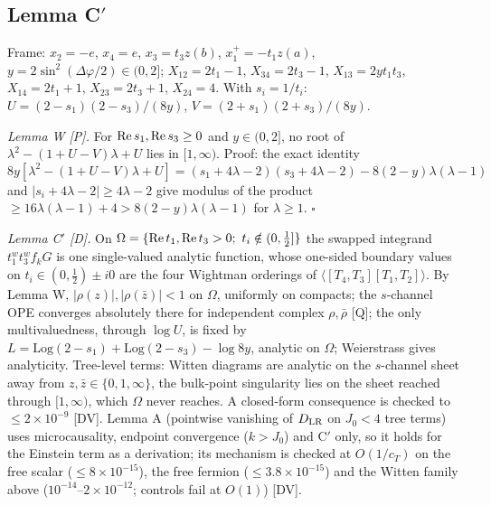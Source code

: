 \documentclass[aps,prl,onecolumn,superscriptaddress,nofootinbib]{revtex4-2}
\begin{document}
\subsection{Lemma C\texorpdfstring{$'$}{'}}
\label{sec:Cprime}
Frame: $x_2=-e$, $x_4=e$, $x_3=t_3z(b)$, $x_1^+=-t_1z(a)$, $y=2\sin^2(\Delta\varphi/2)\in(0,2]$;
$X_{12}=2t_1-1$, $X_{34}=2t_3-1$, $X_{13}=2yt_1t_3$, $X_{14}=2t_1+1$, $X_{23}=2t_3+1$,
$X_{24}=4$. With $s_i=1/t_i$: $U=(2-s_1)(2-s_3)/(8y)$, $V=(2+s_1)(2+s_3)/(8y)$.

\emph{Lemma W [P].} For ${\rm Re}\,s_1,{\rm Re}\,s_3\ge0$ and $y\in(0,2]$, no root of
$\lambda^2-(1+U-V)\lambda+U$ lies in $[1,\infty)$. Proof: the exact identity
\begin{equation}
8y[\lambda^2-(1+U-V)\lambda+U]=(s_1+4\lambda-2)(s_3+4\lambda-2)-8(2-y)\lambda(\lambda-1)
\end{equation}
and $|s_i+4\lambda-2|\ge4\lambda-2$ give modulus of the product $\ge16\lambda(\lambda-1)+4>8(2-y)\lambda(\lambda-1)$
for $\lambda\ge1$. $\square$

\emph{Lemma C$'$ [D].} On
$\Omega=\{{\rm Re}\,t_1,{\rm Re}\,t_3>0;\ t_i\notin(0,\tfrac12]\}$ the swapped integrand
$t_1^wt_3^wf_kG$ is one single-valued analytic function, whose one-sided boundary values on
$t_i\in(0,\tfrac12)\pm i0$ are the four Wightman orderings of $\langle[T_4,T_3][T_1,T_2]\rangle$.
By Lemma W, $|\rho(z)|,|\rho(\bar z)|<1$ on $\Omega$, uniformly on compacts; the $s$-channel OPE
converges absolutely there for independent complex $\rho,\bar\rho$ [Q]; the only multivaluedness,
through $\log U$, is fixed by $L=\mathrm{Log}(2-s_1)+\mathrm{Log}(2-s_3)-\log8y$, analytic on
$\Omega$; Weierstrass gives analyticity. Tree-level terms: Witten diagrams are analytic on the
$s$-channel sheet away from $z,\bar z\in\{0,1,\infty\}$, the bulk-point singularity lies on the
sheet reached through $[1,\infty)$, which $\Omega$ never reaches. A closed-form consequence is
checked to $\le2\times10^{-9}$ [DV]. Lemma A (pointwise vanishing of $D_{\rm LR}$ on $J_0<4$ tree
terms) uses microcausality, endpoint convergence ($k>J_0$) and C$'$ only, so it holds for the
Einstein term as a derivation; its mechanism is checked at $O(1/c_T)$ on the free scalar
($\le8\times10^{-15}$), the free fermion ($\le3.8\times10^{-15}$) and the Witten family above
($10^{-14}$--$2\times10^{-12}$; controls fail at $O(1)$) [DV].
\end{document}
